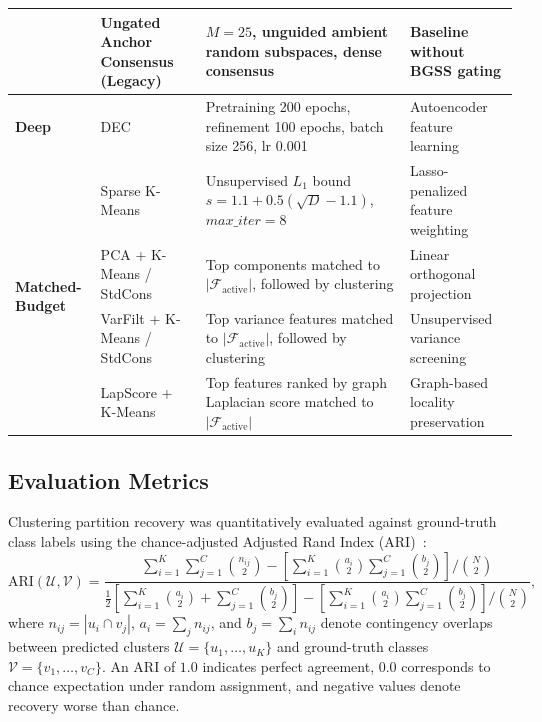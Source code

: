 \documentclass[pdflatex,sn-mathphys-num]{sn-jnl}
\theoremstyle{thmstyleone}
\theoremstyle{thmstyletwo}
\theoremstyle{thmstylethree}
\begin{document}
\begin{table}[!t]
{\begin{tabular}{@{}llp{5.2cm}p{4.2cm}@{}}
  & Ungated Anchor Consensus (Legacy) & $M = 25$, unguided ambient random subspaces, dense consensus & Baseline without BGSS gating \\
\midrule
\textbf{Deep} & DEC & Pretraining 200 epochs, refinement 100 epochs, batch size 256, lr 0.001 & Autoencoder feature learning \\
\midrule
\multirow{4}{*}{\textbf{Matched-Budget}} & Sparse K-Means & Unsupervised $L_1$ bound $s = 1.1 + 0.5(\sqrt{D} - 1.1)$, $max\_iter = 8$ & Lasso-penalized feature weighting \\
\multirow{4}{*}{\textbf{Baselines}} & PCA + K-Means / StdCons & Top components matched to $|\mathcal{F}_{\text{active}}|$, followed by clustering & Linear orthogonal projection \\
  & VarFilt + K-Means / StdCons & Top variance features matched to $|\mathcal{F}_{\text{active}}|$, followed by clustering & Unsupervised variance screening \\
  & LapScore + K-Means & Top features ranked by graph Laplacian score matched to $|\mathcal{F}_{\text{active}}|$ & Graph-based locality preservation \\
\bottomrule
\end{tabular}%
}
\end{table}

\subsection{Evaluation Metrics}\label{sec:setup_metrics}
Clustering partition recovery was quantitatively evaluated against ground-truth class labels using the chance-adjusted Adjusted Rand Index (ARI)~\cite{hubert1985comparing}:
\begin{equation}\label{eq:ari_def}
 \text{ARI}(\mathcal{U}, \mathcal{V}) = \frac{\sum_{i=1}^K \sum_{j=1}^C \binom{n_{ij}}{2} - \left[\sum_{i=1}^K \binom{a_i}{2} \sum_{j=1}^C \binom{b_j}{2}\right] / \binom{N}{2}}{\frac{1}{2}\left[\sum_{i=1}^K \binom{a_i}{2} + \sum_{j=1}^C \binom{b_j}{2}\right] - \left[\sum_{i=1}^K \binom{a_i}{2} \sum_{j=1}^C \binom{b_j}{2}\right] / \binom{N}{2}},
\end{equation}
where $n_{ij} = |u_i \cap v_j|$, $a_i = \sum_j n_{ij}$, and $b_j = \sum_i n_{ij}$ denote contingency overlaps between predicted clusters $\mathcal{U} = \{u_1, \dots, u_K\}$ and ground-truth classes $\mathcal{V} = \{v_1, \dots, v_C\}$. An ARI of $1.0$ indicates perfect agreement, $0.0$ corresponds to chance expectation under random assignment, and negative values denote recovery worse than chance.
\end{document}
